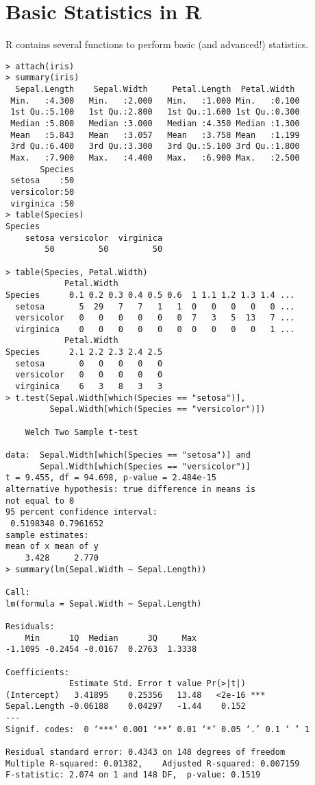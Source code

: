 \section{Basic Statistics in R}
R contains several functions to perform basic (and advanced!) 
statistics. 
\begin{snugshade} \footnotesize
\begin{verbatim}
> attach(iris)
> summary(iris)
  Sepal.Length    Sepal.Width     Petal.Length  Petal.Width   
 Min.   :4.300   Min.   :2.000   Min.   :1.000 Min.   :0.100  
 1st Qu.:5.100   1st Qu.:2.800   1st Qu.:1.600 1st Qu.:0.300  
 Median :5.800   Median :3.000   Median :4.350 Median :1.300  
 Mean   :5.843   Mean   :3.057   Mean   :3.758 Mean   :1.199  
 3rd Qu.:6.400   3rd Qu.:3.300   3rd Qu.:5.100 3rd Qu.:1.800  
 Max.   :7.900   Max.   :4.400   Max.   :6.900 Max.   :2.500  
       Species  
 setosa    :50  
 versicolor:50  
 virginica :50  
> table(Species)
Species
    setosa versicolor  virginica 
        50         50         50

> table(Species, Petal.Width)
            Petal.Width
Species      0.1 0.2 0.3 0.4 0.5 0.6  1 1.1 1.2 1.3 1.4 ...
  setosa       5  29   7   7   1   1  0   0   0   0   0 ...
  versicolor   0   0   0   0   0   0  7   3   5  13   7 ...
  virginica    0   0   0   0   0   0  0   0   0   0   1 ...
            Petal.Width
Species      2.1 2.2 2.3 2.4 2.5
  setosa       0   0   0   0   0
  versicolor   0   0   0   0   0
  virginica    6   3   8   3   3
> t.test(Sepal.Width[which(Species == "setosa")], 
         Sepal.Width[which(Species == "versicolor")])

	Welch Two Sample t-test

data:  Sepal.Width[which(Species == "setosa")] and 
       Sepal.Width[which(Species == "versicolor")] 
t = 9.455, df = 94.698, p-value = 2.484e-15
alternative hypothesis: true difference in means is
not equal to 0 
95 percent confidence interval:
 0.5198348 0.7961652 
sample estimates:
mean of x mean of y 
    3.428     2.770 
> summary(lm(Sepal.Width ~ Sepal.Length))

Call:
lm(formula = Sepal.Width ~ Sepal.Length)

Residuals:
    Min      1Q  Median      3Q     Max 
-1.1095 -0.2454 -0.0167  0.2763  1.3338 

Coefficients:
             Estimate Std. Error t value Pr(>|t|)    
(Intercept)   3.41895    0.25356   13.48   <2e-16 ***
Sepal.Length -0.06188    0.04297   -1.44    0.152    
---
Signif. codes:  0 ‘***’ 0.001 ‘**’ 0.01 ‘*’ 0.05 ‘.’ 0.1 ‘ ’ 1 

Residual standard error: 0.4343 on 148 degrees of freedom
Multiple R-squared: 0.01382,	Adjusted R-squared: 0.007159 
F-statistic: 2.074 on 1 and 148 DF,  p-value: 0.1519 
\end{verbatim}
\end{snugshade}
